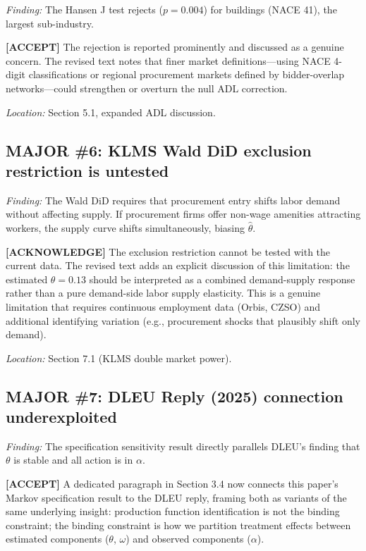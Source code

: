 \documentclass[11pt]{article}
\newcommand{\accept}{\textcolor{accept}{\textbf{[ACCEPT]}}}
\newcommand{\acknowledge}{\textcolor{acknowledge}{\textbf{[ACKNOWLEDGE]}}}
\begin{document}
\textit{Finding:} The Hansen J test rejects ($p = 0.004$) for buildings (NACE 41), the largest sub-industry.

\accept{} The rejection is reported prominently and discussed as a genuine concern. The revised text notes that finer market definitions---using NACE 4-digit classifications or regional procurement markets defined by bidder-overlap networks---could strengthen or overturn the null ADL correction.

\textit{Location:} Section 5.1, expanded ADL discussion.

\subsection*{MAJOR \#6: KLMS Wald DiD exclusion restriction is untested}

\textit{Finding:} The Wald DiD requires that procurement entry shifts labor demand without affecting supply. If procurement firms offer non-wage amenities attracting workers, the supply curve shifts simultaneously, biasing $\hat{\theta}$.

\acknowledge{} The exclusion restriction cannot be tested with the current data. The revised text adds an explicit discussion of this limitation: the estimated $\theta = 0.13$ should be interpreted as a combined demand-supply response rather than a pure demand-side labor supply elasticity. This is a genuine limitation that requires continuous employment data (Orbis, CZSO) and additional identifying variation (e.g., procurement shocks that plausibly shift only demand).

\textit{Location:} Section 7.1 (KLMS double market power).

\subsection*{MAJOR \#7: DLEU Reply (2025) connection underexploited}

\textit{Finding:} The specification sensitivity result directly parallels DLEU's finding that $\theta$ is stable and all action is in $\alpha$.

\accept{} A dedicated paragraph in Section 3.4 now connects this paper's Markov specification result to the DLEU reply, framing both as variants of the same underlying insight: production function identification is not the binding constraint; the binding constraint is how we partition treatment effects between estimated components ($\theta$, $\omega$) and observed components ($\alpha$).
\end{document}
